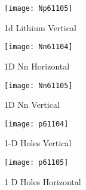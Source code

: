 \begin{landscape}
\begin{figure}[!htp]
\centering
\texttt{[image: Np61105]}
\caption{1d Lithium Vertical} 
\end{figure}
\end{landscape}


\begin{landscape}
\begin{figure}[!htp]
\centering
\texttt{[image: Nn61104]}
\caption{1D Nn Horizontal} 
\end{figure}
\end{landscape}

\begin{landscape}
\begin{figure}[!htp]
\centering
\texttt{[image: Nn61105]}
\caption{1D Nn Vertical} 
\end{figure}
\end{landscape}

\begin{landscape}
\begin{figure}[!htp]
\centering
\texttt{[image: p61104]}
\caption{1-D Holes Vertical} 
\end{figure}
\end{landscape}

\begin{landscape}
\begin{figure}[!htp]
\centering
\texttt{[image: p61105]}
\caption{1 D Holes Horizontal} 
\end{figure}
\end{landscape}


